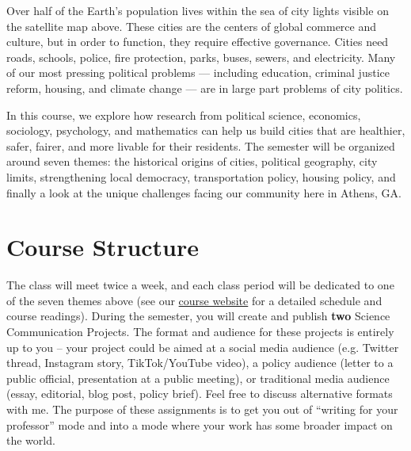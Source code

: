 \documentclass[11pt, letterpaper]{article}
\begin{document}
\noindent Over half of the Earth's population lives within the sea of city lights visible on the satellite map above. These cities are the centers of global commerce and culture, but in order to function, they require effective governance. Cities need roads, schools, police, fire protection, parks, buses, sewers, and electricity. Many of our most pressing political problems --- including education, criminal justice reform, housing, and climate change --- are in large part problems of city politics.

In this course, we explore how research from political science, economics, sociology, psychology, and mathematics can help us build cities that are healthier, safer, fairer, and more livable for their residents. The semester will be organized around seven themes: the historical origins of cities, political geography, city limits, strengthening local democracy, transportation policy, housing policy, and finally a look at the unique challenges facing our community here in Athens, GA. 



\section*{Course Structure}

The class will meet twice a week, and each class period will be dedicated to one of the seven themes above (see our \href{https://joeornstein.github.io/pols-4641/}{course website} for a detailed schedule and course readings). During the semester, you will create and publish \textbf{two} Science Communication Projects. The format and audience for these projects is entirely up to you -- your project could be aimed at a social media audience (e.g. Twitter thread, Instagram story, TikTok/YouTube video), a policy audience (letter to a public official, presentation at a public meeting), or traditional media audience (essay, editorial, blog post, policy brief). Feel free to discuss alternative formats with me. The purpose of these assignments is to get you out of ``writing for your professor'' mode and into a mode where your work has some broader impact on the world.
\end{document}
